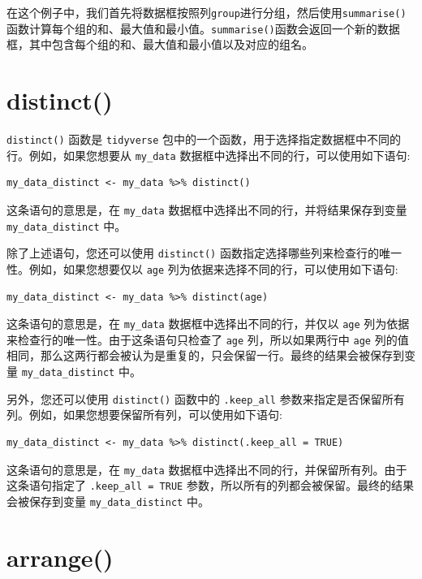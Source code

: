\documentclass[
  letterpaper,
  DIV=11,
  numbers=noendperiod]{scrreprt}
\begin{document}
在这个例子中，我们首先将数据框按照列\texttt{group}进行分组，然后使用\texttt{summarise()}函数计算每个组的和、最大值和最小值。\texttt{summarise()}函数会返回一个新的数据框，其中包含每个组的和、最大值和最小值以及对应的组名。

\hypertarget{distinct}{%
\section{distinct()}\label{distinct}}

\texttt{distinct()} 函数是 \texttt{tidyverse}
包中的一个函数，用于选择指定数据框中不同的行。例如，如果您想要从
\texttt{my\_data} 数据框中选择出不同的行，可以使用如下语句:

\begin{verbatim}
my_data_distinct <- my_data %>% distinct()
\end{verbatim}

这条语句的意思是，在 \texttt{my\_data}
数据框中选择出不同的行，并将结果保存到变量 \texttt{my\_data\_distinct}
中。

除了上述语句，您还可以使用 \texttt{distinct()}
函数指定选择哪些列来检查行的唯一性。例如，如果您想要仅以 \texttt{age}
列为依据来选择不同的行，可以使用如下语句:

\begin{verbatim}
my_data_distinct <- my_data %>% distinct(age)
\end{verbatim}

这条语句的意思是，在 \texttt{my\_data} 数据框中选择出不同的行，并仅以
\texttt{age} 列为依据来检查行的唯一性。由于这条语句只检查了 \texttt{age}
列，所以如果两行中 \texttt{age}
列的值相同，那么这两行都会被认为是重复的，只会保留一行。最终的结果会被保存到变量
\texttt{my\_data\_distinct} 中。

另外，您还可以使用 \texttt{distinct()} 函数中的 \texttt{.keep\_all}
参数来指定是否保留所有列。例如，如果您想要保留所有列，可以使用如下语句:

\begin{verbatim}
my_data_distinct <- my_data %>% distinct(.keep_all = TRUE)
\end{verbatim}

这条语句的意思是，在 \texttt{my\_data}
数据框中选择出不同的行，并保留所有列。由于这条语句指定了
\texttt{.keep\_all\ =\ TRUE}
参数，所以所有的列都会被保留。最终的结果会被保存到变量
\texttt{my\_data\_distinct} 中。

\hypertarget{arrange}{%
\section{arrange()}\label{arrange}}
\end{document}
